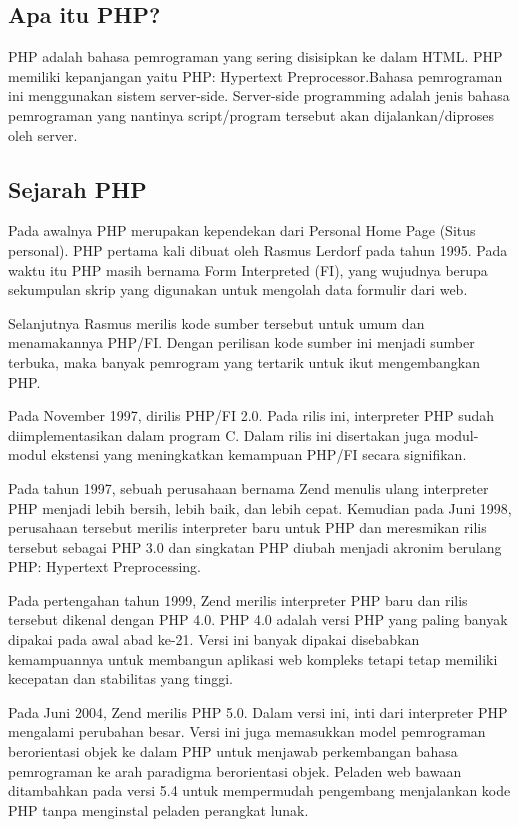 \begin{enumerate}
\subsection{Apa itu PHP?}
PHP adalah bahasa pemrograman yang sering disisipkan ke dalam HTML. PHP memiliki kepanjangan yaitu PHP: Hypertext Preprocessor.Bahasa pemrograman ini menggunakan sistem server-side. Server-side programming adalah jenis bahasa pemrograman yang nantinya script/program tersebut akan dijalankan/diproses oleh server. 

\subsection{Sejarah PHP}
Pada awalnya PHP merupakan kependekan dari Personal Home Page (Situs personal). PHP pertama kali dibuat oleh Rasmus Lerdorf pada tahun 1995. Pada waktu itu PHP masih bernama Form Interpreted (FI), yang wujudnya berupa sekumpulan skrip yang digunakan untuk mengolah data formulir dari web.

Selanjutnya Rasmus merilis kode sumber tersebut untuk umum dan menamakannya PHP/FI. Dengan perilisan kode sumber ini menjadi sumber terbuka, maka banyak pemrogram yang tertarik untuk ikut mengembangkan PHP.

Pada November 1997, dirilis PHP/FI 2.0. Pada rilis ini, interpreter PHP sudah diimplementasikan dalam program C. Dalam rilis ini disertakan juga modul-modul ekstensi yang meningkatkan kemampuan PHP/FI secara signifikan.

Pada tahun 1997, sebuah perusahaan bernama Zend menulis ulang interpreter PHP menjadi lebih bersih, lebih baik, dan lebih cepat. Kemudian pada Juni 1998, perusahaan tersebut merilis interpreter baru untuk PHP dan meresmikan rilis tersebut sebagai PHP 3.0 dan singkatan PHP diubah menjadi akronim berulang PHP: Hypertext Preprocessing.

Pada pertengahan tahun 1999, Zend merilis interpreter PHP baru dan rilis tersebut dikenal dengan PHP 4.0. PHP 4.0 adalah versi PHP yang paling banyak dipakai pada awal abad ke-21. Versi ini banyak dipakai disebabkan kemampuannya untuk membangun aplikasi web kompleks tetapi tetap memiliki kecepatan dan stabilitas yang tinggi.

Pada Juni 2004, Zend merilis PHP 5.0. Dalam versi ini, inti dari interpreter PHP mengalami perubahan besar. Versi ini juga memasukkan model pemrograman berorientasi objek ke dalam PHP untuk menjawab perkembangan bahasa pemrograman ke arah paradigma berorientasi objek. Peladen web bawaan ditambahkan pada versi 5.4 untuk mempermudah pengembang menjalankan kode PHP tanpa menginstal peladen perangkat lunak.


\end{enumerate}
